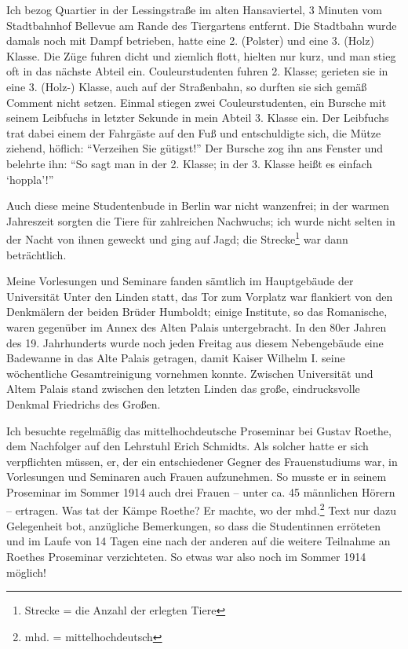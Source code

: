 \documentclass[a5paper,pagesize,10pt,twoside=true]{scrbook}
\begin{document}
Ich bezog Quartier in der Lessingstraße im alten Hansaviertel, 3 Minuten vom Stadtbahnhof Bellevue am Rande des Tiergartens entfernt. Die Stadtbahn wurde damals noch mit Dampf betrieben, hatte eine 2. (Polster) und eine 3. (Holz) Klasse. Die Züge fuhren dicht und ziemlich flott, hielten nur kurz, und man stieg oft in das nächste Abteil ein. Couleurstudenten fuhren 2. Klasse; gerieten sie in eine 3. (Holz-) Klasse, auch auf der Straßenbahn, so durften sie sich gemäß Comment nicht setzen. Einmal stiegen zwei Couleurstudenten, ein Bursche mit seinem Leibfuchs in letzter Sekunde in mein Abteil 3. Klasse ein. Der Leibfuchs trat dabei einem der Fahrgäste auf den Fuß und entschuldigte sich, die Mütze ziehend, höflich: \enquote{Verzeihen Sie gütigst!} Der Bursche zog ihn ans Fenster und belehrte ihn: \enquote{So sagt man in der 2. Klasse; in der 3. Klasse heißt es einfach \enquote{hoppla}!}

Auch diese meine Studentenbude in Berlin war nicht wanzenfrei; in der warmen Jahreszeit sorgten die Tiere für zahlreichen Nachwuchs; ich wurde nicht selten in der Nacht von ihnen geweckt und ging auf Jagd; die Strecke\footnote{Strecke = die Anzahl der erlegten Tiere} war dann beträchtlich.

Meine Vorlesungen und Seminare fanden sämtlich im Hauptgebäude der Universität Unter den Linden statt, das Tor zum Vorplatz war flankiert von den Denkmälern der beiden Brüder Humboldt; einige Institute, so das Romanische, waren gegenüber im Annex des Alten Palais untergebracht. In den 80er Jahren des 19. Jahrhunderts wurde noch jeden Freitag aus diesem Nebengebäude eine Badewanne in das Alte Palais getragen, damit Kaiser Wilhelm I. seine wöchentliche Gesamtreinigung vornehmen konnte. Zwischen Universität und Altem Palais stand zwischen den letzten Linden das große, eindrucksvolle Denkmal Friedrichs des Großen.

Ich besuchte regelmäßig das mittelhochdeutsche Proseminar bei Gustav Roethe, dem Nachfolger auf den Lehrstuhl Erich Schmidts. Als solcher hatte er sich verpflichten müssen, er, der ein entschiedener Gegner des Frauenstudiums war, in Vorlesungen und Seminaren auch Frauen aufzunehmen. So musste er in seinem Proseminar im Sommer 1914 auch drei Frauen -- unter ca. 45 männlichen Hörern -- ertragen. Was tat der Kämpe Roethe? Er machte, wo der mhd.\footnote{mhd. = mittelhochdeutsch} Text nur dazu Gelegenheit bot, anzügliche Bemerkungen, so dass die Studentinnen erröteten und im Laufe von 14 Tagen eine nach der anderen auf die weitere Teilnahme an Roethes Proseminar verzichteten. So etwas war also noch im Sommer 1914 möglich!
\end{document}
